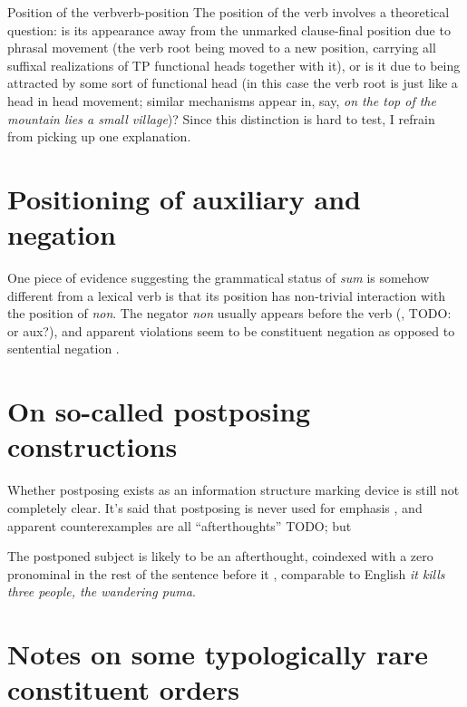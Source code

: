 \documentclass[a4paper, oneside, 12pt]{report}
\newcommand*{\citesec}[1]{\S~{#1}}
\newcommand*{\citepage}[1]{p.~{#1}}
\newcommand{\form}[1]{\emph{#1}}
\begin{document}
\begin{infobox}{Position of the verb}{verb-position}
    The position of the verb involves a theoretical question:
    is its appearance away from the unmarked clause-final position
    due to phrasal movement 
    (the verb root being moved to a new position, 
    carrying all suffixal realizations of 
    TP functional heads together with it),
    or is it due to being attracted by some sort of functional head
    (in this case the verb root is just like a head in head movement;
    similar mechanisms appear in, say, 
    \form{on the top of the mountain \emph{lies} a small village})?
    Since this distinction is hard to test, 
    I refrain from picking up one explanation.
\end{infobox}

\section{Positioning of auxiliary and negation}\label{sec:constituent-order.aux-neg}



One piece of evidence suggesting the grammatical status of \form{sum} 
is somehow different from a lexical verb 
is that its position has non-trivial interaction 
with the position of \form{non}.
The negator \form{non} usually appears before the verb 
(\citealt[\citesec{1.5}]{danckaert2017development}, TODO: or aux?),
and apparent violations seem to be constituent negation 
as opposed to sentential negation \citep[\citepage{43}]{danckaert2017development}.

\section{On so-called postposing constructions}\label{sec:clause-order.postpone}

Whether postposing exists as an information structure marking device 
is still not completely clear. 
It's said that postposing is never used for emphasis \citep[\citepage{395}]{allen1903allen},
and apparent counterexamples are all ``afterthoughts'' TODO;
but 

The postponed subject is likely to be an afterthought, 
coindexed with a zero pronominal 
in the rest of the sentence before it
\citet[\citepage{87}]{devine2006latin},
comparable to English \form{it kills three people, the wandering puma}.

\section{Notes on some typologically rare constituent orders}
\end{document}
